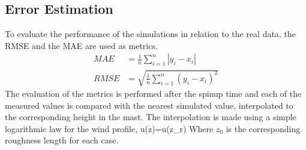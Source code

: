 \begin{table}[H]
	\caption{Model Physics for B1, B2 and B3}\label{tab:05_param_bol}
	\centering\footnotesize{}
\end{table}







\subsection{Error Estimation}
To evaluate the performance of the simulations in relation to the real data, the RMSE and the MAE are used as metrics.
\begin{align}
MAE &= \frac{1}{n}\sum_{i=1}^n|y_i-x_i|\\
RMSE &= \sqrt{\frac{1}{n}\sum_{i=1}^n(y_i-x_i)^2}
\end{align}
The evaluation of the metrics is performed after the spinup time and each of the measured values is compared with the nearest simulated value, interpolated to the corresponding height in the mast. The interpolation is made using a simple logarithmic law for the wind profile,
\be 
u(z)=u(z_r)
\ee
Where $z_0$ is the corresponding roughness length for each case.

